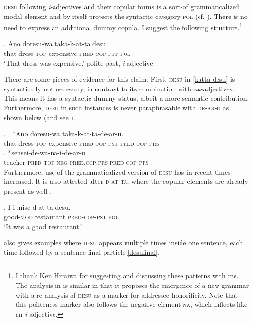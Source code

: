 \documentclass [output=book,colorlinks,citecolor=brown]{langscibook}
\begin{document}
\textsc{desu} following \textit{i}-adjectives and their copular forms is a sort-of grammaticalized modal element and by itself projects the syntactic category \textsc{pol} (cf. \citealt[10–11]{yamada:2023:looking}). There is no need to express an additional dummy copula. I suggest the following structure.\footnote{I thank Ken Hiraiwa for suggesting and discussing these patterns with me. The analysis in \citet{yamada:2023:looking} is similar in that it proposes the emergence of a new grammar with a re-analysis of \textsc{desu} as a marker for addressee honorificity. Note that this politeness marker also follows the negative element \textsc{na}, which inflects like an \textit{i}-adjective.} %

\exg. Ano doresu-wa taka-k-at-ta desu.\\
that dress-\textsc{top} expensive-\textsc{pred-cop-pst} \textsc{pol}\\
`That dress was expensive.' \null \hfill polite past, \textit{i}-adjective \label{katta desu}

There are some pieces of evidence for this claim. First, \textsc{desu} in \ref{katta desu} is syntactically not necessary, in contrast to its combination with \textit{na}-adjectives. This means it has a syntactic dummy status, albeit a more semantic contribution. Furthermore, \textsc{desu} in such instances is never paraphrasable with \textsc{de-ar-u} as shown below (and see \citealt[10–11]{yamada:2023:looking}).

\ex. \ag. *Ano doresu-wa taka-k-at-ta-de-ar-u.\\
that dress-\textsc{top} expensive-\textsc{pred-cop-pst-pred-cop-prs}\\
\bg. *sensei-de-wa-na-i-de-ar-u\\
teacher-\textsc{pred-top-neg-pred.cop.prs-pred-cop-prs}\\

Furthermore, use of the grammaticalized version of \textsc{desu} has in recent times increased. It is also attested after \textsc{d-at-ta}, where the copular elements are already present as well \citep{yamada:2023:looking}.

\exg. I-i mise d-at-ta desu.\\
good-\textsc{mod} restaurant \textsc{pred-cop-pst} \textsc{pol}\\
`It was a good restaurant.’ \null \hfill \citep[13]{yamada:2023:looking} \label{desudatta} %

\citet{yamada:2023:looking} also gives examples where \textsc{desu} appears multiple times inside one sentence, each time followed by a sentence-final particle \ref{desufinal}.
\end{document}
